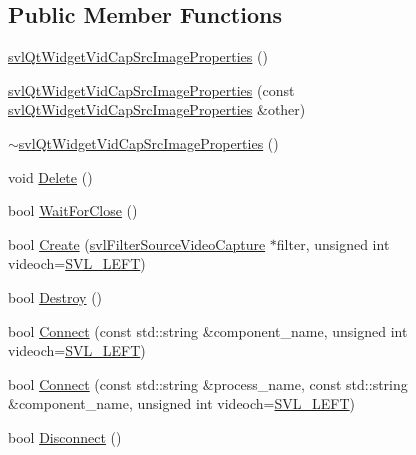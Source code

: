 \subsection*{Public Member Functions}
\begin{DoxyCompactItemize}
\item 
\hyperlink{classsvl_qt_widget_vid_cap_src_image_properties_a0cb5bc895ddd2c84fbb9034f84c87028}{svl\+Qt\+Widget\+Vid\+Cap\+Src\+Image\+Properties} ()
\item 
\hyperlink{classsvl_qt_widget_vid_cap_src_image_properties_a8605cbcf1352874760d179154a6cef56}{svl\+Qt\+Widget\+Vid\+Cap\+Src\+Image\+Properties} (const \hyperlink{classsvl_qt_widget_vid_cap_src_image_properties}{svl\+Qt\+Widget\+Vid\+Cap\+Src\+Image\+Properties} \&other)
\item 
\hyperlink{classsvl_qt_widget_vid_cap_src_image_properties_a7fab52aa9b9bb3595d320822d1581356}{$\sim$svl\+Qt\+Widget\+Vid\+Cap\+Src\+Image\+Properties} ()
\item 
void \hyperlink{classsvl_qt_widget_vid_cap_src_image_properties_af0ddf53a66bdf0fbb8c36e7e9e13de2f}{Delete} ()
\item 
bool \hyperlink{classsvl_qt_widget_vid_cap_src_image_properties_a1741bc3973dec7677087578553a469fd}{Wait\+For\+Close} ()
\item 
bool \hyperlink{classsvl_qt_widget_vid_cap_src_image_properties_a3c09d4365eb66766c1ea48f2c7fad494}{Create} (\hyperlink{classsvl_filter_source_video_capture}{svl\+Filter\+Source\+Video\+Capture} $\ast$filter, unsigned int videoch=\hyperlink{svl_definitions_8h_ab9fec7615f19c8df2919eebcab0b187f}{S\+V\+L\+\_\+\+L\+E\+F\+T})
\item 
bool \hyperlink{classsvl_qt_widget_vid_cap_src_image_properties_a6da9ed333d5e43397ea8ecbbfa852d6e}{Destroy} ()
\item 
bool \hyperlink{classsvl_qt_widget_vid_cap_src_image_properties_aaaf4b33ea35a127de6ff9f97e67af14a}{Connect} (const std\+::string \&component\+\_\+name, unsigned int videoch=\hyperlink{svl_definitions_8h_ab9fec7615f19c8df2919eebcab0b187f}{S\+V\+L\+\_\+\+L\+E\+F\+T})
\item 
bool \hyperlink{classsvl_qt_widget_vid_cap_src_image_properties_abf7af58acabf230ed8f301f614e7030e}{Connect} (const std\+::string \&process\+\_\+name, const std\+::string \&component\+\_\+name, unsigned int videoch=\hyperlink{svl_definitions_8h_ab9fec7615f19c8df2919eebcab0b187f}{S\+V\+L\+\_\+\+L\+E\+F\+T})
\item 
bool \hyperlink{classsvl_qt_widget_vid_cap_src_image_properties_a05fe65bf6e08caa942752f336c4fe8e8}{Disconnect} ()
\end{DoxyCompactItemize}
